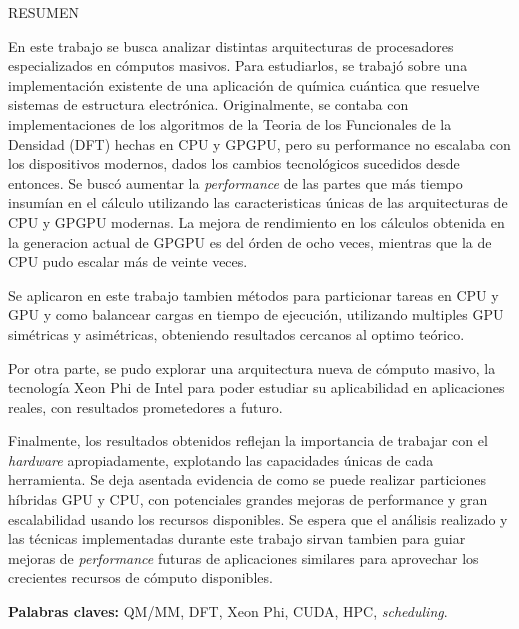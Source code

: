 \begin{center}
\large \textsc{RESUMEN}
\end{center}
\vspace{1cm}

\noindent

En este trabajo se busca analizar distintas arquitecturas de procesadores especializados
en c\'omputos masivos. Para estudiarlos, se trabaj\'o sobre una implementaci\'on existente
de una aplicaci\'on de qu\'imica cu\'antica que resuelve sistemas de estructura electr\'onica.
Originalmente, se contaba con implementaciones de los algoritmos de la Teoria de los
Funcionales de la Densidad (DFT) hechas en CPU y GPGPU, pero su performance no escalaba con los
dispositivos modernos, dados los cambios tecnol\'ogicos sucedidos desde entonces. Se busc\'o
aumentar la \textit{performance} de las partes que m\'as tiempo insum\'ian en el c\'alculo utilizando
las caracteristicas \'unicas de las arquitecturas de CPU y GPGPU modernas. La mejora de
rendimiento en los c\'alculos obtenida en la generacion actual de GPGPU es del \'orden de ocho
veces, mientras que la de CPU pudo escalar m\'as de veinte veces.

Se aplicaron en este trabajo tambien m\'etodos para particionar tareas en CPU y GPU y como
balancear cargas en tiempo de ejecuci\'on, utilizando multiples GPU sim\'etricas y asim\'etricas,
obteniendo resultados cercanos al optimo te\'orico.

Por otra parte, se pudo explorar una arquitectura nueva de c\'omputo masivo, la
tecnolog\'ia Xeon Phi de Intel para poder estudiar su aplicabilidad en aplicaciones reales, con
resultados prometedores a futuro.

Finalmente, los resultados obtenidos reflejan la importancia de trabajar con el \textit{hardware}
apropiadamente, explotando las capacidades \'unicas de cada herramienta. Se deja asentada evidencia
de como se puede realizar particiones h\'ibridas GPU y CPU, con potenciales grandes mejoras
de performance y gran escalabilidad usando los recursos disponibles. Se espera que el an\'alisis
realizado y las t\'ecnicas implementadas durante este trabajo sirvan tambien para guiar mejoras
de \textit{performance} futuras de aplicaciones similares para aprovechar los crecientes recursos de c\'omputo
disponibles.

\bigskip

\noindent\textbf{Palabras claves:} QM/MM, DFT, Xeon Phi, CUDA, HPC, \textit{scheduling}.
